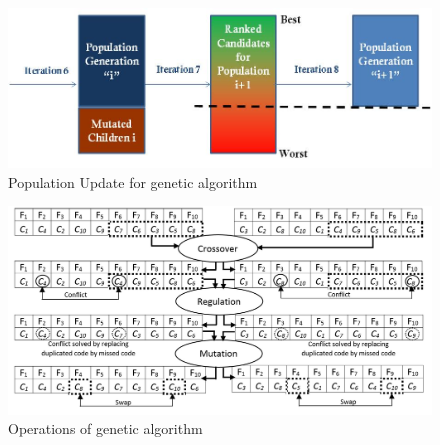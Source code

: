 \documentclass[preprint,12pt]{elsarticle}
\begin{document}
\begin{figure}[thpb]
\begin{center}

\includegraphics[scale=0.7]{Images/Drawing1.jpg}
\caption{Population Update for genetic algorithm}
\end{center}
\label{Fig2}
\end{figure}

\begin{figure}[h]
\begin{center}

\includegraphics[scale=0.5]{Images/Drawing2.jpg}
\caption{Operations of genetic algorithm}
\end{center}
\label{Fig3}
\end{figure}
\end{document}
